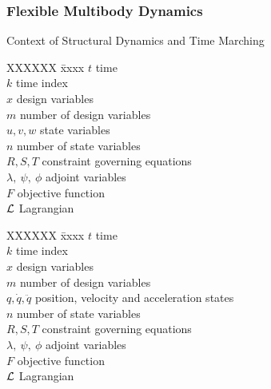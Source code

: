 \documentclass{beamer}
\begin{document}
\begin{frame}\frametitle{Flexible Multibody Dynamics}\tiny{

    \begin{block}{Context of Structural Dynamics and Time Marching}
      \begin{minipage}{0.45\linewidth}
        \begin{tabbing}
          XXXXXX \= xxxx\kill
          $t$     \> time \\
          $k$     \> time index \\
          $x$     \> design variables \\
          $m$     \> number of design variables \\
          \colorbox{blue!20}{$u,v,w$} \> \colorbox{blue!20}{state variables} \\
          $n$  \> number of state variables \\
          \colorbox{green!20}{$R, S, T$} \> constraint governing equations  \\
          $\lambda ,~ \psi ,~\phi$ \> adjoint variables  \\
          $F$     \> objective function \\
          $\cal{L}$ \> Lagrangian \\
        \end{tabbing}
      \end{minipage}\hfill
      \begin{minipage}{0.45\linewidth}
        \begin{tabbing}
          XXXXXX \= xxxx\kill
          $t$     \> time \\
          $k$     \> time index \\
          $x$     \> design variables \\
          $m$     \> number of design variables \\
          \colorbox{blue!20}{$q,\dot{q},\ddot{q}$} \> \colorbox{blue!20}{position, velocity and acceleration states} \\
          $n$  \> number of state variables \\
          \colorbox{green!20}{$R, S, T$} \> constraint governing equations  \\
          $\lambda ,~ \psi ,~\phi$ \> adjoint variables  \\
          $F$     \> objective function \\
          $\cal{L}$ \> Lagrangian \\
        \end{tabbing}
      \end{minipage}
    \end{block}
    
}
\end{frame}
\end{document}
